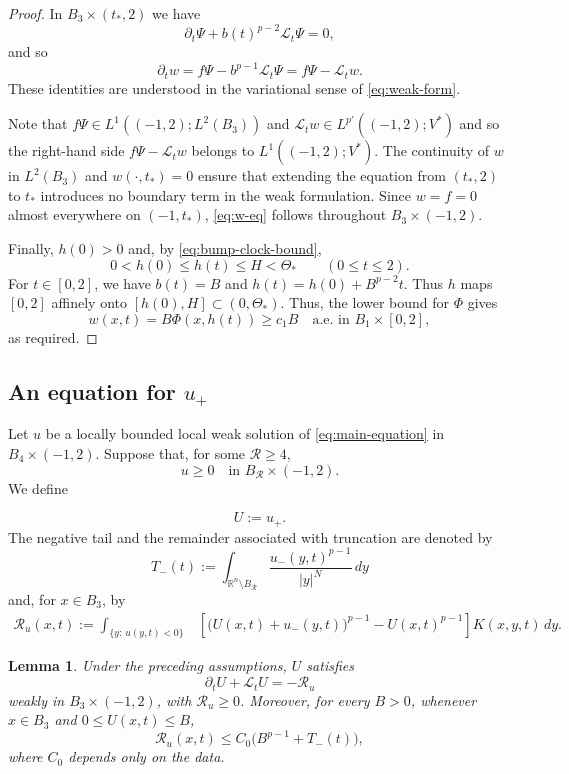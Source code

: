 \documentclass[10pt]{amsart}
\theoremstyle{plain}
\newtheorem{lemma}{Lemma}[section]
\theoremstyle{definition}
\theoremstyle{remark}
\numberwithin{equation}{section}
\newcommand{\R}{\mathbb R}
\begin{document}
\begin{proof}
In $B_3 \times (t_*,2)$ we have
\[
\partial_t\Psi+b(t)^{p-2}\mathcal L_t\Psi=0,
\]
and so
\[
\partial_tw
=f\Psi-b^{p-1}\mathcal L_t\Psi
=f\Psi-\mathcal L_tw.
\]
These identities are understood in the variational sense of
\eqref{eq:weak-form}. 

Note that $f\Psi\in L^1((-1,2);L^2(B_3))$ and
$\mathcal L_tw\in L^{p'}((-1,2);V^*)$ and so the right-hand side
$f\Psi-\mathcal L_tw$ belongs to $L^1((-1,2);V^*)$.
The continuity of $w$ in $L^2(B_3)$ and $w(\cdot,t_*)=0$ ensure
that extending the equation from $(t_*,2)$ to $t_*$ introduces no
boundary term in the weak formulation. Since $w=f=0$ almost
everywhere on $(-1,t_*)$, \eqref{eq:w-eq} follows throughout
$B_3\times(-1,2)$.

Finally, $h(0)>0$ and, by \eqref{eq:bump-clock-bound},
\[
0<h(0)\le h(t)\le H<\Theta_*
\qquad(0\le t\le2).
\]
For $t\in[0,2]$, we have $b(t)=B$ and
$h(t)=h(0)+B^{p-2}t$. Thus $h$ maps $[0,2]$ affinely onto
$[h(0),H]\subset(0,\Theta_*)$. Thus, the lower bound for
$\Phi$ gives
\[
w(x,t)=B\Phi(x,h(t))\ge c_1B
\quad\text{a.e. in }B_1\times[0,2],
\]
as required.
\end{proof}

\subsection{An equation for $u_+$}
Let $u$ be a locally bounded local weak solution of
\eqref{eq:main-equation} in $B_4\times(-1,2)$.
Suppose that, for some $\mathcal R\ge4$,
\begin{equation}\label{eq:local-nonnegative-normalized}
u\ge0
\quad\text{in }B_{\mathcal R}\times(-1,2).
\end{equation}
We define

\[
    U:=u_+.
\]
The negative tail and the remainder associated with truncation
are denoted by
\begin{equation}\label{eq:Tminus}
T_-(t)
:=
\int_{\R^n\setminus B_{\mathcal R}}
\frac{u_-(y,t)^{p-1}}{|y|^N}\,dy
\end{equation}
and, for $x\in B_3$, by
\begin{equation}\label{eq:R-def}
\begin{split}
\mathcal R_u(x,t)
:=
\int_{\{y:\,u(y,t)<0\}}
&\left[
\bigl(U(x,t)+u_-(y,t)\bigr)^{p-1}
-
U(x,t)^{p-1}
\right]
K(x,y,t)\,dy.
\end{split}
\end{equation}

\begin{lemma}\label{lem:remainder}
Under the preceding assumptions, $U$ satisfies
\begin{equation}\label{eq:U-equation}
\partial_tU+\mathcal{L}_tU=-\mathcal R_u
\end{equation}
weakly in $B_3\times(-1,2)$, with $\mathcal R_u\ge0$.
Moreover, for every $B>0$, whenever $x\in B_3$ and
$0\le U(x,t)\le B$,
\begin{equation}\label{eq:R-est}
\mathcal R_u(x,t)
\le
C_0\bigl(B^{p-1}+T_-(t)\bigr),
\end{equation}
where $C_0$ depends only on the data.
\end{lemma}
\end{document}
